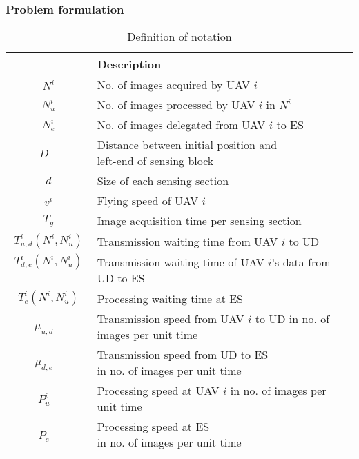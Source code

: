 \documentclass{ieeeaccess}
\begin{document}
\subsubsection{Problem formulation}

\begin{table}[t]
\centering
\caption{Definition of notation}
  \begin{tabular}{|c|l|} \hline
 & Description
 \\ \hline
 $N^i$ & No. of images acquired by UAV $i$ \\ \hline
 $N_u^i$ & No. of images processed by UAV $i$ in $N^i$ \\ \hline
 $N_e^i$ & No. of images delegated from UAV $i$ to ES   \\ \hline
 \shortstack[l]{$D$\\ ~}& \shortstack[l]{Distance between initial position and \\left-end of sensing block} \\ \hline
 $d$ & Size of each sensing section     \\ \hline
  $v^{i}$ & Flying speed of UAV $i$    \\ \hline
 $T_g$ & Image acquisition time per sensing section \\ \hline
 $T_{u,d}^{i}(N^i,N_u^i)$ & Transmission waiting time from UAV $i$ to UD  \\ \hline
 \shortstack[l]{$T_{d,e}^{i}(N^i,N_u^i)$\\ ~} & \shortstack[l]{Transmission waiting time of UAV $i$'s data\\from UD to ES}  \\ \hline
 $T_e^{i}(N^i,N_u^i)$ & Processing waiting time at ES  \\ \hline
 \shortstack[l]{$\mu_{u,d}$\\ ~} & \shortstack[l]{Transmission speed from UAV $i$ to UD\\in no. of images per unit time} \\ \hline
 \shortstack[l]{$\mu_{d,e}$\\ ~} &  \shortstack[l]{Transmission speed from UD to ES\\in no. of images per unit time} \\ \hline
 \shortstack[l]{$P_u^i$\\ ~} &  \shortstack[l]{Processing speed at UAV $i$\\in no. of images per unit time} \\ \hline
 \shortstack[l]{$P_e$\\ ~} &   \shortstack[l]{Processing speed at ES\\in no. of images per unit time} \\ \hline
\end{tabular}
\label{para}
\end{table}
\end{document}
